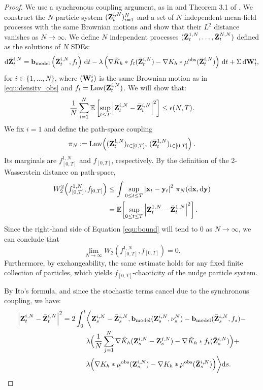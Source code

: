 \begin{proof}
We use a synchronous coupling argument, as in \cite{sznitman2006topics} and Theorem 3.1 of \cite{chaintron2021propagation}. We construct the $N$-particle system $(\mathbf{Z}_t^{i,N})_{i=1}^N$ and a set of $N$ independent mean-field processes with the same Brownian motions and show that their $L^2$ distance vanishes as $N\to \infty$. We define $N$ independent processes $(\bar{\mathbf{Z}}^{1,N}_t,\dots,\bar{\mathbf{Z}}^{N,N}_t)$ defined as the solutions of $N$ SDEs:
\begin{equation*}
\mathrm{d} \bar{\mathbf{Z}}^{i,N}_t
= \mathbf{b}_{\mathrm{model}}\left(\bar{\mathbf{Z}}^{i,N}_t, f_t \right)\,\mathrm{d} t-  \lambda\left(\nabla \tilde{K}_h*f_t(\bar{\mathbf{Z}}^{i,N}_t)  -  \nabla   K_h *\mu^{\mathrm{obs}} (\bar{\mathbf{Z}}^{i,N}_t)\right)\,\mathrm{d} t  + \Sigma \,\mathrm{d} \mathbf{W}^i_t,
\end{equation*}
for $i\in\{1,\dots,N\}$, where $(\mathbf{W}^i_t)$ is the same Brownian motion as in \eqref{equ:density_obs} and $f_t = \mathrm{Law}(\bar{\mathbf{Z}}^{i,N}_t)$. We will show that:
\begin{equation}\label{equ:bound}
   \frac{1}{N}\sum_{i=1}^N \mathbb E\left[\sup_{t\leq T}\left|\mathbf{Z}^{i,N}_t-\bar{\mathbf{Z}}^{i,N}_t\right|^2\right] \leq \epsilon (N,T). 
\end{equation} 
We fix $i=1$ and define the path-space coupling
\[
\pi_N:=\mathrm{Law}\!\left( (\mathbf{Z}_t^{1,N})_{t\in[0,T]},\,(\bar {\mathbf{Z}}_t^{1,N})_{t\in[0,T]} \right).
\]
Its marginals are $f_{[0,T]}^{1,N}$ and $f_{[0,T]}$, respectively. By the definition of the 2-Wasserstein distance on path-space,
\[
\begin{aligned}
W_2^2\!\left(f_{[0,T]}^{1,N},f_{[0,T]}\right)
&\le
\int \sup_{0\le t\le T}\left|\mathbf{x}_t-\mathbf{y}_t\right|^2\,\pi_N(\mathrm{d} \mathbf{x},\mathrm{d} \mathbf{y}) \\
&=
\mathbb{E}\!\left[\sup_{0\le t\le T}\left|\mathbf{Z}_t^{1,N}-\bar {\mathbf{Z}}_t^{1,N}\right|^2\right].
\end{aligned}
\]
Since the right-hand side of Equation \eqref{equ:bound} will tend to $0$ as $N\to\infty$, we can conclude that
\[
\lim_{N\to\infty} W_2\left(f_{[0,T]}^{1,N},f_{[0,T]}\right) = 0.
\]
Furthermore, by exchangeability, the same estimate holds for any fixed finite collection of particles, which yields $f_{[0,T]}$-chaoticity of the nudge particle system. 

By Ito's formula, and since the stochastic terms cancel due to the synchronous coupling, we have:
\begin{equation*}
\begin{aligned}
\left|\mathbf{Z}^{i,N}_t - \bar{\mathbf{Z}}^{i,N}_t\right|^2 = 
2 \int_0^t &\bigg\langle \mathbf{Z}^{i,N}_s - \bar{\mathbf{Z}}^{i,N}_s, 
\mathbf{b}_\mathrm{model}(\mathbf{Z}^{i,N}_s, \nu_s^N) - \mathbf{b}_\mathrm{model}(\bar{\mathbf{Z}}^{i,N}_s, f_s) - \\
&\lambda \Big(\frac{1}{N}\sum_{j=1}^N \nabla \tilde  K_h(\mathbf{Z}^{i,N}_s - \mathbf{Z}^{j,N}_s) - \nabla\tilde{K}_h * f_t(\bar{\mathbf{Z}}^{i,N}_s)  \Big) +\\
& \lambda\Big(\nabla   K_h *\mu^{\mathrm{obs}} (\mathbf{Z}^{i,N}_s) - \nabla   K_h *\mu^{\mathrm{obs}} (\bar{\mathbf{Z}}^{i,N}_s)\Big)\bigg\rangle \mathrm{d} s.
\end{aligned}
\end{equation*}


\end{proof}
